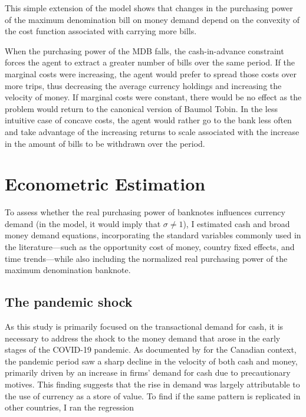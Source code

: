 \documentclass[12pt]{article}
\begin{document}
This simple extension of the model shows that changes in the purchasing power of the maximum denomination bill on money demand depend on the convexity of the cost function associated with carrying more bills.

When the purchasing power of the MDB falls, the cash-in-advance constraint forces the agent to extract a greater number of bills over the same period. If the marginal costs were increasing, the agent would prefer to spread those costs over more trips, thus decreasing the average currency holdings and increasing the velocity of money. If marginal costs were constant, there would be no effect as the problem would return to the canonical version of Baumol Tobin. In the less intuitive case of concave costs, the agent would rather go to the bank less often and take advantage of the increasing returns to scale associated with the increase in the amount of bills to be withdrawn over the period.

\section{Econometric Estimation} \label{econometric}

To assess whether the real purchasing power of banknotes influences currency demand (in the model, it would imply that $\sigma \neq 1$), I estimated cash and broad money demand equations, incorporating the standard variables commonly used in the literature—such as the opportunity cost of money, country fixed effects, and time trends—while also including the normalized real purchasing power of the maximum denomination banknote.

\subsection{The pandemic shock}

As this study is primarily focused on the transactional demand for cash, it is necessary to address the shock to the money demand that arose in the early stages of the COVID-19 pandemic. As documented by \cite{ChenHeng2020CaCT} for the Canadian context, the pandemic period saw a sharp decline in the velocity of both cash and money, primarily driven by an increase in firms' demand for cash due to precautionary motives. This finding suggests that the rise in demand was largely attributable to the use of currency as a store of value. To find if the same pattern is replicated in other countries, I ran the regression
\end{document}
